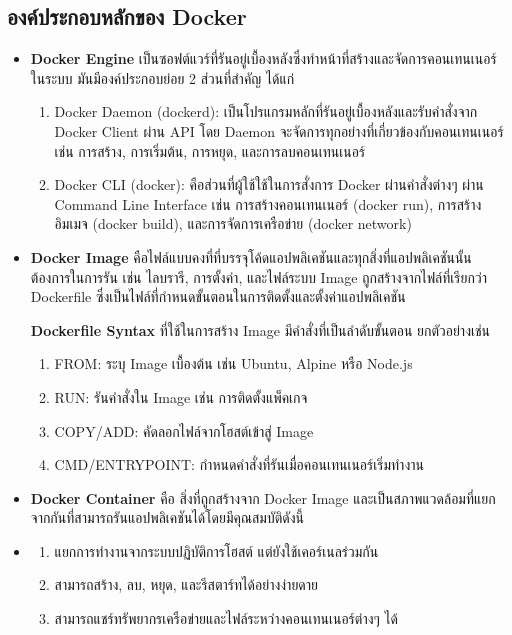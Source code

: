 \subsection{องค์ประกอบหลักของ Docker}
\begin{itemize}
  \item \textbf{Docker Engine} เป็นซอฟต์แวร์ที่รันอยู่เบื้องหลังซึ่งทำหน้าที่สร้างและจัดการคอนเทนเนอร์ในระบบ มันมีองค์ประกอบย่อย 2 ส่วนที่สำคัญ ได้แก่
  \begin{enumerate}
    \item Docker Daemon (dockerd): เป็นโปรแกรมหลักที่รันอยู่เบื้องหลังและรับคำสั่งจาก Docker Client ผ่าน API โดย Daemon จะจัดการทุกอย่างที่เกี่ยวข้องกับคอนเทนเนอร์ เช่น การสร้าง, การเริ่มต้น, การหยุด, และการลบคอนเทนเนอร์
    \item Docker CLI (docker): คือส่วนที่ผู้ใช้ใช้ในการสั่งการ Docker ผ่านคำสั่งต่างๆ ผ่าน Command Line Interface เช่น การสร้างคอนเทนเนอร์ (docker run), การสร้างอิมเมจ (docker build), และการจัดการเครือข่าย (docker network)
  \end{enumerate}
  \item \textbf{Docker Image} คือไฟล์แบบคงที่ที่บรรจุโค้ดแอปพลิเคชันและทุกสิ่งที่แอปพลิเคชันนั้นต้องการในการรัน เช่น ไลบรารี, การตั้งค่า, และไฟล์ระบบ Image ถูกสร้างจากไฟล์ที่เรียกว่า Dockerfile ซึ่งเป็นไฟล์ที่กำหนดขั้นตอนในการติดตั้งและตั้งค่าแอปพลิเคชัน
  
  \textbf{Dockerfile Syntax} ที่ใช้ในการสร้าง Image มีคำสั่งที่เป็นลำดับขั้นตอน ยกตัวอย่างเช่น
  \hspace{1cm}\begin{enumerate}
    \item FROM: ระบุ Image เบื้องต้น เช่น Ubuntu, Alpine หรือ Node.js
    \item RUN: รันคำสั่งใน Image เช่น การติดตั้งแพ็คเกจ
    \item COPY/ADD: คัดลอกไฟล์จากโฮสต์เข้าสู่ Image
    \item CMD/ENTRYPOINT: กำหนดคำสั่งที่รันเมื่อคอนเทนเนอร์เริ่มทำงาน
  \end{enumerate}
  \item \textbf{Docker Container} คือ สิ่งที่ถูกสร้างจาก Docker Image และเป็นสภาพแวดล้อมที่แยกจากกันที่สามารถรันแอปพลิเคชันได้โดยมีคุณสมบัติดังนี้
  \item \begin{enumerate}
    \item แยกการทำงานจากระบบปฏิบัติการโฮสต์ แต่ยังใช้เคอร์เนลร่วมกัน
    \item สามารถสร้าง, ลบ, หยุด, และรีสตาร์ทได้อย่างง่ายดาย
    \item สามารถแชร์ทรัพยากรเครือข่ายและไฟล์ระหว่างคอนเทนเนอร์ต่างๆ ได้
  \end{enumerate}
\end{itemize}

